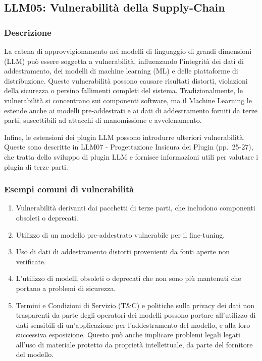 \documentclass[
]{article}
\author{}
\date{}
\providecommand{\tightlist}{%
  \setlength{\itemsep}{0pt}\setlength{\parskip}{0pt}}
\begin{document}
\subsection{LLM05: Vulnerabilità della
Supply-Chain}\label{llm05-vulnerabilituxe0-della-supply-chain}

\subsubsection{Descrizione}\label{descrizione}

La catena di approvvigionamento nei modelli di linguaggio di grandi
dimensioni (LLM) può essere soggetta a vulnerabilità, influenzando
l'integrità dei dati di addestramento, dei modelli di machine learning
(ML) e delle piattaforme di distribuzione. Queste vulnerabilità possono
causare risultati distorti, violazioni della sicurezza o persino
fallimenti completi del sistema. Tradizionalmente, le vulnerabilità si
concentrano sui componenti software, ma il Machine Learning le estende
anche ai modelli pre-addestrati e ai dati di addestramento forniti da
terze parti, suscettibili ad attacchi di manomissione e avvelenamento.

Infine, le estensioni dei plugin LLM possono introdurre ulteriori
vulnerabilità. Queste sono descritte in LLM07 - Progettazione Insicura
dei Plugin (pp.~25-27), che tratta dello sviluppo di plugin LLM e
fornisce informazioni utili per valutare i plugin di terze parti.

\subsubsection{Esempi comuni di
vulnerabilità}\label{esempi-comuni-di-vulnerabilituxe0}

\begin{enumerate}
\def\labelenumi{\arabic{enumi}.}
\tightlist
\item
  Vulnerabilità derivanti dai pacchetti di terze parti, che includono
  componenti obsoleti o deprecati.
\item
  Utilizzo di un modello pre-addestrato vulnerabile per il fine-tuning.
\item
  Uso di dati di addestramento distorti provenienti da fonti aperte non
  verificate.
\item
  L'utilizzo di modelli obsoleti o deprecati che non sono più mantenuti
  che portano a problemi di sicurezza.
\item
  Termini e Condizioni di Servizio (T\&C) e politiche sulla privacy dei
  dati non trasparenti da parte degli operatori dei modelli possono
  portare all'utilizzo di dati sensibili di un'applicazione per
  l'addestramento del modello, e alla loro successiva esposizione.
  Questo può anche implicare problemi legali legati all'uso di materiale
  protetto da proprietà intellettuale, da parte del fornitore del
  modello.
\end{enumerate}
\end{document}

